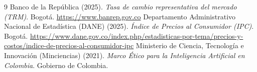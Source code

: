 \documentclass[11pt]{tg_usta}
\begin{document}
\renewcommand{\refname}{Referencias}
\begin{thebibliography}{9}
 Banco de la República (2025). \emph{Tasa de cambio representativa del mercado (TRM)}. Bogotá. \url{https://www.banrep.gov.co}
 Departamento Administrativo Nacional de Estadística (DANE) (2025). \emph{Índice de Precios al Consumidor (IPC)}. Bogotá. \url{https://www.dane.gov.co/index.php/estadisticas-por-tema/precios-y-costos/indice-de-precios-al-consumidor-ipc}
 Ministerio de Ciencia, Tecnología e Innovación (Minciencias) (2021). \emph{Marco Ético para la Inteligencia Artificial en Colombia}. Gobierno de Colombia.
\end{thebibliography}
\end{document}
